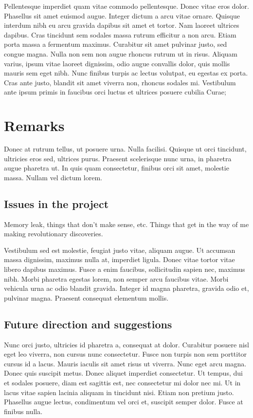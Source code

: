 \documentclass[parskip=full]{scrreprt}
\begin{document}
Pellentesque imperdiet quam vitae commodo pellentesque. Donec vitae eros dolor. Phasellus sit amet euismod augue. Integer dictum a arcu vitae ornare. Quisque interdum nibh eu arcu gravida dapibus sit amet et tortor. Nam laoreet ultrices dapibus. Cras tincidunt sem sodales massa rutrum efficitur a non arcu. Etiam porta massa a fermentum maximus. Curabitur sit amet pulvinar justo, sed congue magna. Nulla non sem non augue rhoncus rutrum ut in risus. Aliquam varius, ipsum vitae laoreet dignissim, odio augue convallis dolor, quis mollis mauris sem eget nibh. Nunc finibus turpis ac lectus volutpat, eu egestas ex porta. Cras ante justo, blandit sit amet viverra non, rhoncus sodales mi. Vestibulum ante ipsum primis in faucibus orci luctus et ultrices posuere cubilia Curae;

\chapter{Remarks}
\label{ch:remarks}

Donec at rutrum tellus, ut posuere urna. Nulla facilisi. Quisque ut orci tincidunt, ultricies eros sed, ultrices purus. Praesent scelerisque nunc urna, in pharetra augue pharetra ut. In quis quam consectetur, finibus orci sit amet, molestie massa. Nullam vel dictum lorem. 

\section{Issues in the project}
\label{sec:issues}

Memory leak, things that don't make sense, etc. Things that get in the way of me making revolutionary discoveries.

Vestibulum sed est molestie, feugiat justo vitae, aliquam augue. Ut accumsan massa dignissim, maximus nulla at, imperdiet ligula. Donec vitae tortor vitae libero dapibus maximus. Fusce a enim faucibus, sollicitudin sapien nec, maximus nibh. Morbi pharetra egestas lorem, non semper arcu faucibus vitae. Morbi vehicula urna ac odio blandit gravida. Integer id magna pharetra, gravida odio et, pulvinar magna. Praesent consequat elementum mollis.

\section{Future direction and suggestions}
\label{sec:future}

Nunc orci justo, ultricies id pharetra a, consequat at dolor. Curabitur posuere nisl eget leo viverra, non cursus nunc consectetur. Fusce non turpis non sem porttitor cursus id a lacus. Mauris iaculis sit amet risus ut viverra. Nunc eget arcu magna. Donec quis suscipit metus. Donec aliquet imperdiet consectetur. Ut tempus, dui et sodales posuere, diam est sagittis est, nec consectetur mi dolor nec mi. Ut in lacus vitae sapien lacinia aliquam in tincidunt nisi. Etiam non pretium justo. Phasellus augue lectus, condimentum vel orci et, suscipit semper dolor. Fusce at finibus nulla.
\end{document}
